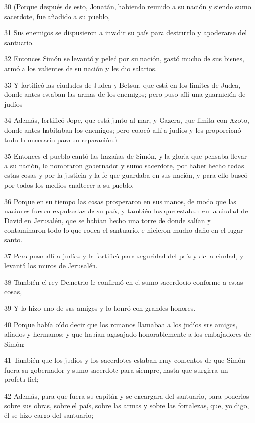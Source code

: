 \par 30 (Porque después de esto, Jonatán, habiendo reunido a su nación y siendo sumo sacerdote, fue añadido a su pueblo,
\par 31 Sus enemigos se dispusieron a invadir su país para destruirlo y apoderarse del santuario.
\par 32 Entonces Simón se levantó y peleó por su nación, gastó mucho de sus bienes, armó a los valientes de su nación y les dio salarios.
\par 33 Y fortificó las ciudades de Judea y Betsur, que está en los límites de Judea, donde antes estaban las armas de los enemigos; pero puso allí una guarnición de judíos:
\par 34 Además, fortificó Jope, que está junto al mar, y Gazera, que limita con Azoto, donde antes habitaban los enemigos; pero colocó allí a judíos y les proporcionó todo lo necesario para su reparación.)
\par 35 Entonces el pueblo cantó las hazañas de Simón, y la gloria que pensaba llevar a su nación, lo nombraron gobernador y sumo sacerdote, por haber hecho todas estas cosas y por la justicia y la fe que guardaba en sus nación, y para ello buscó por todos los medios enaltecer a su pueblo.
\par 36 Porque en su tiempo las cosas prosperaron en sus manos, de modo que las naciones fueron expulsadas de su país, y también los que estaban en la ciudad de David en Jerusalén, que se habían hecho una torre de donde salían y contaminaron todo lo que rodea el santuario, e hicieron mucho daño en el lugar santo.
\par 37 Pero puso allí a judíos y la fortificó para seguridad del país y de la ciudad, y levantó los muros de Jerusalén.
\par 38 También el rey Demetrio le confirmó en el sumo sacerdocio conforme a estas cosas,
\par 39 Y lo hizo uno de sus amigos y lo honró con grandes honores.
\par 40 Porque había oído decir que los romanos llamaban a los judíos sus amigos, aliados y hermanos; y que habían agasajado honorablemente a los embajadores de Simón;
\par 41 También que los judíos y los sacerdotes estaban muy contentos de que Simón fuera su gobernador y sumo sacerdote para siempre, hasta que surgiera un profeta fiel;
\par 42 Además, para que fuera su capitán y se encargara del santuario, para ponerlos sobre sus obras, sobre el país, sobre las armas y sobre las fortalezas, que, yo digo, él se hizo cargo del santuario;
